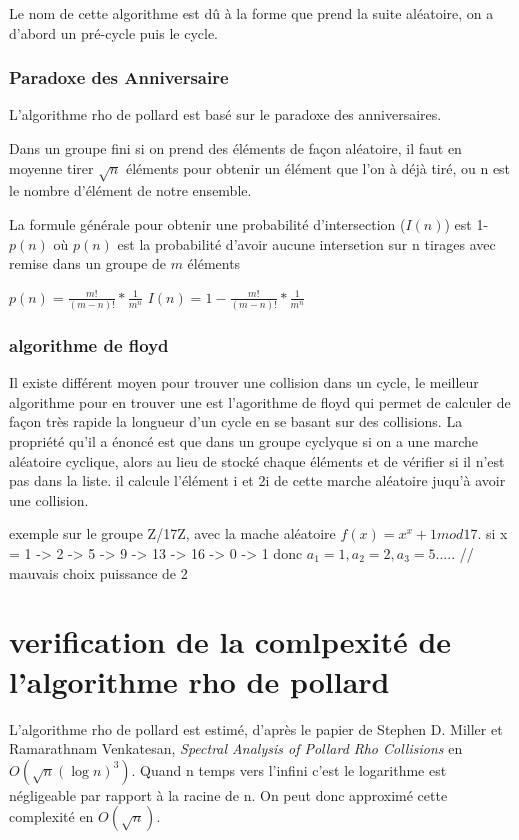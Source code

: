 \documentclass[a4paper,10pt]{report}
\begin{document}
Le nom de cette algorithme est dû à la forme que prend la suite aléatoire, on a d'abord un pré-cycle puis le cycle.

\subsection{Paradoxe des Anniversaire}
L'algorithme rho de pollard est basé sur le paradoxe des anniversaires.

 Dans un groupe fini si on prend des éléments de façon aléatoire,
il faut en moyenne tirer $\sqrt{n}$ éléments pour obtenir un élément que l'on à déjà tiré, ou n est le nombre d'élément de notre ensemble.

La formule générale pour obtenir une probabilité d'intersection ($I(n)$) est 1-$p(n)$ où $p(n)$ est la probabilité d'avoir aucune intersetion sur n tirages avec remise dans un groupe de $m$ éléments
\begin{center}
    $p(n) = \frac{m!}{(m - n)!}*\frac{1}{m^n}$
    $I(n) = 1 - \frac{m!}{(m - n)!}*\frac{1}{m^n}$
\end{center}




\subsection{algorithme de floyd}

Il existe différent moyen pour trouver une collision dans un cycle, le meilleur algorithme pour en trouver
une est l'agorithme de floyd qui permet de calculer de façon très rapide la longueur d'un cycle en se basant sur des collisions.
La propriété qu'il a énoncé est que dans un groupe cyclyque si on a une marche aléatoire cyclique, alors au lieu de stocké chaque 
éléments et de vérifier si il n'est pas dans la liste. il calcule l'élément i et 2i de cette marche aléatoire juqu'à avoir une 
collision.

exemple sur le groupe Z/17Z, avec la mache aléatoire $f(x) = x^x + 1 mod 17$.
si x = 1 -> 2 -> 5 -> 9 -> 13 -> 16 -> 0 -> 1
donc $a_1 = 1, a_2 = 2, a_3 = 5 .....$
// mauvais choix puissance de 2

\chapter{verification de la comlpexité de l'algorithme rho de pollard}

L'algorithme rho de pollard est estimé, d'après le papier de Stephen D. Miller et Ramarathnam Venkatesan, \textit{Spectral Analysis of Pollard Rho Collisions} en $O(\sqrt{n}(\log{n})^3)$. 
Quand n temps vers l'infini c'est le logarithme est négligeable par rapport à la racine de n. On peut donc approximé cette complexité en $O(\sqrt{n})$.
\end{document}

